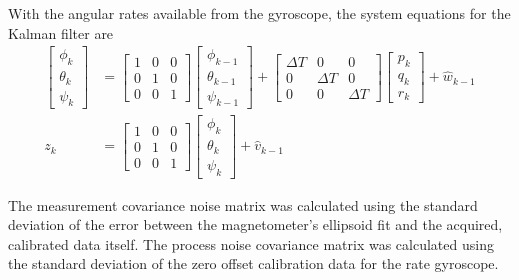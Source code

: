 With the angular rates available from the gyroscope, the system equations for the Kalman filter are
\begin{align}
\begin{bmatrix}
\phi_{k}\\
\theta_{k}\\
\psi_{k}
\end{bmatrix} & = \begin{bmatrix}
1 & 0 & 0\\0 & 1 & 0\\0 & 0 & 1
\end{bmatrix}\begin{bmatrix}
\phi_{k-1}\\
\theta_{k-1}\\
\psi_{k-1}
\end{bmatrix}
+ \begin{bmatrix}
\Delta T & 0 & 0 \\ 0 & \Delta T & 0\\0 & 0 & \Delta T
\end{bmatrix}\begin{bmatrix} 
p_k \\ q_k \\ r_k 
\end{bmatrix}+\hat{w}_{k-1}\\
z_k & = \begin{bmatrix}
1 & 0 &0\\0&1&0\\0&0&1
\end{bmatrix}\begin{bmatrix}
\phi_{k}\\
\theta_{k}\\
\psi_{k}
\end{bmatrix}+\hat{v}_{k-1}
\end{align}

The measurement covariance noise matrix was calculated using the standard deviation of the error between the magnetometer's ellipsoid fit and the acquired, calibrated data itself. The process noise covariance matrix was calculated using the standard deviation of the zero offset calibration data for the rate gyroscope.

